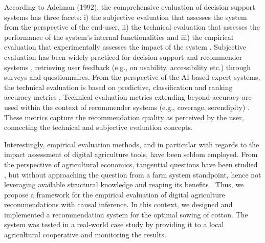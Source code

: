 \documentclass[letterpaper]{article} %
\begin{document}
According to Adelman (1992), the comprehensive evaluation of decision support systems has three facets: i) the subjective evaluation that assesses the system from the perspective of the end-user, ii) the technical evaluation that assesses the performance of the system's internal functionalities and iii) the empirical evaluation that experimentally assesses the impact of the system \cite{adelman1992evaluating}. Subjective evaluation has been widely practiced for decision support  \cite{zhai2020decision}  and recommender systems \cite{pu2012evaluating}, retrieving user feedback (e.g., on usability, accessibility etc.) through surveys and questionnaires. From the perspective of the AI-based expert systems, the technical evaluation is based on predictive, classification and ranking accuracy metrics \cite{schroder2011setting}. Technical evaluation metrics extending beyond accuracy are used within the context of recommender systems (e.g., coverage, serendipity) \cite{ge2010beyond}. These metrics capture the recommendation quality as perceived by the user, connecting the technical and subjective evaluation concepts.

Interestingly, empirical evaluation methods, and in particular with regards to the impact assessment of digital agriculture tools, have been seldom employed.
From the perspective of agricultural economics, tangential questions have been studied \cite{muller1974sources, roberts2009estimating, schimmelpfennig2016sequential, mcfadden2022information}, but without approaching the question from a farm system standpoint, hence not leveraging available structural knowledge and reaping its benefits \cite{cinelli_crash_2020}.
Thus, we propose a framework for the empirical evaluation of digital agriculture recommendations with causal inference.
In this context, we designed and implemented a recommendation system for the optimal sowing of cotton. The system was tested in a real-world case study by providing it to a local agricultural cooperative and monitoring the results.
\end{document}
